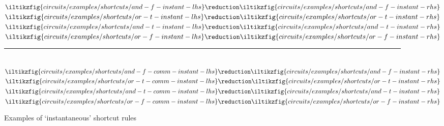 \begin{figure}
    \centering
    \(
    \iltikzfig{circuits/examples/shortcuts/and-f-instant-lhs}
    \reduction
    \iltikzfig{circuits/examples/shortcuts/and-f-instant-rhs}
    \)
    \quad
    \(
    \iltikzfig{circuits/examples/shortcuts/or-t-instant-lhs}
    \reduction
    \iltikzfig{circuits/examples/shortcuts/or-t-instant-rhs}
    \)
    \quad
    \(
    \iltikzfig{circuits/examples/shortcuts/and-t-instant-lhs}
    \reduction
    \iltikzfig{circuits/examples/shortcuts/and-t-instant-rhs}
    \)
    \quad
    \(
    \iltikzfig{circuits/examples/shortcuts/or-f-instant-lhs}
    \reduction
    \iltikzfig{circuits/examples/shortcuts/or-f-instant-rhs}
    \)
    \\[0.25em]
    \rule{\textwidth}{0.1mm}
    \\[0.25em]
    \(
    \iltikzfig{circuits/examples/shortcuts/and-f-comm-instant-lhs}
    \reduction
    \iltikzfig{circuits/examples/shortcuts/and-f-instant-rhs}
    \)
    \quad
    \(
    \iltikzfig{circuits/examples/shortcuts/or-t-comm-instant-lhs}
    \reduction
    \iltikzfig{circuits/examples/shortcuts/or-t-instant-rhs}
    \)
    \quad
    \(
    \iltikzfig{circuits/examples/shortcuts/and-t-comm-instant-lhs}
    \reduction
    \iltikzfig{circuits/examples/shortcuts/and-t-instant-rhs}
    \)
    \quad
    \(
    \iltikzfig{circuits/examples/shortcuts/or-f-comm-instant-lhs}
    \reduction
    \iltikzfig{circuits/examples/shortcuts/or-f-instant-rhs}
    \)
    \caption{Examples of `instantaneous' shortcut rules}
    \label{fig:shortcuts}
\end{figure}